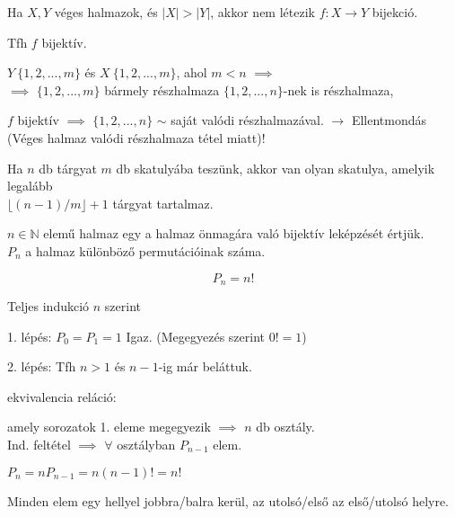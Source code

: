 \begin{frame}
  \begin{tcolorbox}[title={Tétel: Skatulya-elv}]
    Ha $X, Y$ véges halmazok, és $|X| > |Y|$, akkor nem létezik $f: X \rightarrow Y$ bijekció.
  \tcblower
    \mmedskip
    
    Tfh $f$ bijektív.\\
    \msmallskip
    
    $Y ~ \{1, 2, ..., m\}$ és $X ~ \{1, 2, ..., m\}$, ahol $m < n$ $\implies$\\
    $\implies$ $\{1, 2, ..., m\}$ bármely részhalmaza $\{1, 2, ..., n\}$-nek is részhalmaza,\\
    \msmallskip
    
    $f$ bijektív $\implies$ $\{1, 2, ..., n\}$ $\sim$ saját valódi részhalmazával. $\rightarrow$ Ellentmondás (Véges halmaz valódi részhalmaza tétel miatt)!\\
    \bigskip

     Ha $n$ db tárgyat $m$ db skatulyába teszünk, akkor van olyan skatulya, amelyik legalább\\
    $\lfloor (n - 1) / m \rfloor + 1$ tárgyat tartalmaz.
  \end{tcolorbox}
\end{frame}

\begin{frame}
  \begin{tcolorbox}[title={Def.: Permutáció}]
    $n \in \mathbb{N}$ elemű halmaz egy  a halmaz önmagára való bijektív leképzését értjük.\\
    $P_n$ a halmaz különböző permutációinak száma.
  \end{tcolorbox}

  \begin{tcolorbox}[title={Tétel: Permutációk száma}]
    $$P_n = n!$$
  \tcblower
    \mmedskip
    
    Teljes indukció $n$ szerint\\
    \msmallskip
    
    1. lépés: $P_0 = P_1 = 1$ Igaz. (Megegyezés szerint $0! = 1$)\\
    \msmallskip
    
    2. lépés: Tfh $n > 1$ és $n - 1$-ig már beláttuk.\\
    \msmallskip
    
    ekvivalencia reláció:\\
    \mtinyskip
    
    amely sorozatok 1. eleme megegyezik $\implies$ $n$ db osztály.\\
    Ind. feltétel $\implies$ $\forall$ osztályban $P_{n - 1}$ elem.\\
    \msmallskip
    
    $P_n = nP_{n - 1} = n(n - 1)! = n!$
  \end{tcolorbox}

  \begin{tcolorbox}[title={Def.: Ciklikus permutáció}]
    Minden elem egy hellyel jobbra/balra kerül, az utolsó/első az első/utolsó helyre.
  \end{tcolorbox}
\end{frame}

